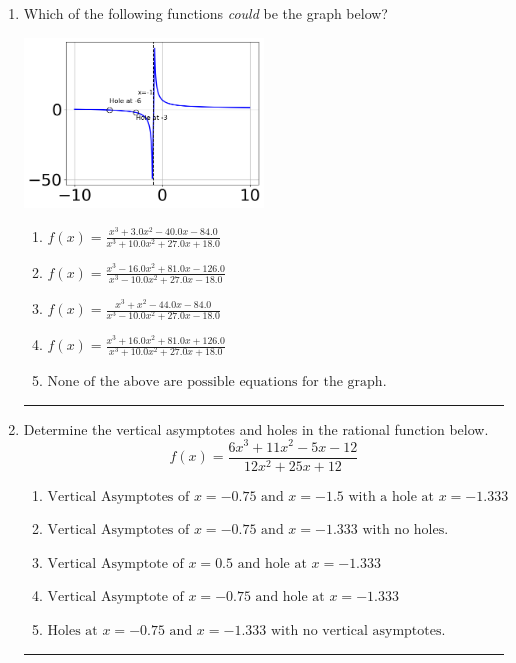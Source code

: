 \documentclass[14pt]{extbook}
\newcommand{\litem}[1]{\item#1\hspace*{-1cm}\rule{\textwidth}{0.4pt}}
\begin{document}
\begin{enumerate}
{\begin{enumerate}[label=\Alph*.]
\end{enumerate} }
\litem{
Which of the following functions \textit{could} be the graph below?
\begin{center}
    \includegraphics[width=0.5\textwidth]{../Figures/identifyGraphOfRationalFunctionA.png}
\end{center}
\begin{enumerate}[label=\Alph*.]
\item \( f(x)=\frac{x^{3} +3.0 x^{2} -40.0 x -84.0}{x^{3} +10.0 x^{2} +27.0 x + 18.0} \)
\item \( f(x)=\frac{x^{3} -16.0 x^{2} +81.0 x -126.0}{x^{3} -10.0 x^{2} +27.0 x -18.0} \)
\item \( f(x)=\frac{x^{3} + x^{2} -44.0 x -84.0}{x^{3} -10.0 x^{2} +27.0 x -18.0} \)
\item \( f(x)=\frac{x^{3} +16.0 x^{2} +81.0 x + 126.0}{x^{3} +10.0 x^{2} +27.0 x + 18.0} \)
\item \( \text{None of the above are possible equations for the graph.} \)

\end{enumerate} }
\litem{
Determine the vertical asymptotes and holes in the rational function below.\[ f(x) = \frac{6x^{3} +11 x^{2} -5 x -12}{12x^{2} +25 x + 12} \]\begin{enumerate}[label=\Alph*.]
\item \( \text{Vertical Asymptotes of } x = -0.75 \text{ and } x = -1.5 \text{ with a hole at } x = -1.333 \)
\item \( \text{Vertical Asymptotes of } x = -0.75 \text{ and } x = -1.333 \text{ with no holes.} \)
\item \( \text{Vertical Asymptote of } x = 0.5 \text{ and hole at } x = -1.333 \)
\item \( \text{Vertical Asymptote of } x = -0.75 \text{ and hole at } x = -1.333 \)
\item \( \text{Holes at } x = -0.75 \text{ and } x = -1.333 \text{ with no vertical asymptotes.} \)


\end{enumerate}}
\end{enumerate}
\end{document}
